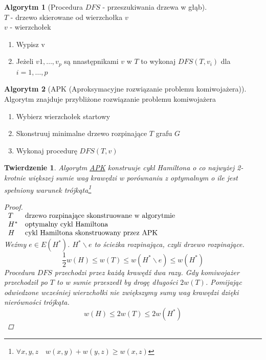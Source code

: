 \documentclass[12pt,a4paper]{article}
\newtheorem{tw}{Twierdzenie}
\theoremstyle{definition}
\newtheorem{algo}{Algorytm}
\newcommand{\egz}{\marginpar{\color{red} EGZAMIN}} %
\begin{document}
\begin{algo}[Procedura $DFS$ - przeszukiwania drzewa w głąb]~\\
$T$ - drzewo skierowane od wierzchołka $v$\\
$v$ - wierzchołek
\begin{enumerate}
	\item Wypisz v
	\item Jeżeli $v1, \dots, v_p$ są nnastępnikami $v$ w $T$ to wykonaj $DFS(T, v_i)$ dla $i = 1, \dots, p$
\end{enumerate}
\end{algo}

\begin{algo}[APK (Aproksymacyjne rozwiązanie problemu komiwojażera)]~\\\label{algo:apk}
Algorytm znajduje przybliżone rozwiązanie problemu komiwojażera
\begin{enumerate}
	\item Wybierz wierzchołek startowy
	\item Skonstruuj minimalne drzewo rozpinające $T$ grafu $G$
	\item Wykonaj procedurę $DFS(T, v)$
\end{enumerate}
\end{algo}

\begin{tw}\egz
Algorytm \hyperref[algo:apk]{APK} konstruuje cykl Hamiltona o co najwyżej 2-krotnie większej sumie wag krawędzi w porównaniu z optymalnym o ile jest spełniony warunek trójkąta\footnote{$\forall x,y,z \quad w(x,y) + w(y,z) \geqslant w(x,z)$}
\begin{proof}~\\
$\begin{array}{l l}
T & \text{drzewo rozpinające skonstruowane w algorytmie}\\
H^* & \text{optymalny cykl Hamiltona}\\
H & \text{cykl Hamiltona skonstruowany przez APK}
\end{array}$\\
Weźmy $e\in E(H^*)$. $H^*\smallsetminus e$ to ścieżka rozpinająca, czyli drzewo rozpinające.
$$ \frac 12w(H) \leqslant w(T) \leqslant w(H^*\smallsetminus e) \leqslant w(H^*) $$
Procedura $DFS$ przechodzi przez każdą krawędź dwa razy. Gdy komiwojażer przechodził po $T$ to w sumie przeszedł by drogę długości $2w(T)$. Pomijając odwiedzone wcześniej wierzchołki nie zwiększymy sumy wag krawędzi dzięki nierówności trójkąta.
$$ w(H) \leqslant 2w(T) \leqslant 2w(H^*) $$
\end{proof}
\end{tw}
\end{document}
